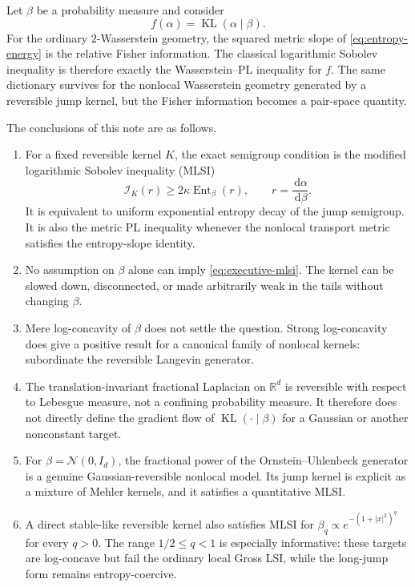\documentclass[11pt]{article}
\theoremstyle{definition}
\DeclareMathOperator{\Ent}{Ent}
\DeclareMathOperator{\KL}{KL}
\newcommand{\R}{\mathbb R}
\newcommand{\dd}{\,\mathrm d}
\newcommand{\cI}{\mathcal I}
\newcommand{\abs}[1]{\left\lvert #1\right\rvert}
\begin{document}
Let $\beta$ be a probability measure and consider
\begin{equation}\label{eq:entropy-energy}
  f(\alpha)=\KL(\alpha\mid\beta).
\end{equation}
For the ordinary $2$-Wasserstein geometry, the squared metric slope of
\eqref{eq:entropy-energy} is the relative Fisher information.  The classical
logarithmic Sobolev inequality is therefore exactly the Wasserstein--PL
inequality for $f$.  The same dictionary survives for the nonlocal
Wasserstein geometry generated by a reversible jump kernel, but the Fisher
information becomes a pair-space quantity.

The conclusions of this note are as follows.
\begin{enumerate}[label=\arabic*.,leftmargin=2.2em]
  \item For a fixed reversible kernel $K$, the exact semigroup condition is
  the modified logarithmic Sobolev inequality (MLSI)
  \begin{equation}\label{eq:executive-mlsi}
    \cI_K(r)\geq 2\kappa\Ent_\beta(r),
    \qquad r=\frac{\dd\alpha}{\dd\beta}.
  \end{equation}
  It is equivalent to uniform exponential entropy decay of the jump
  semigroup.  It is also the metric PL inequality whenever the nonlocal
  transport metric satisfies the entropy-slope identity.
  \item No assumption on $\beta$ alone can imply
  \eqref{eq:executive-mlsi}.  The kernel can be slowed down, disconnected, or
  made arbitrarily weak in the tails without changing $\beta$.
  \item Mere log-concavity of $\beta$ does not settle the question.  Strong
  log-concavity does give a positive result for a canonical family of
  nonlocal kernels: subordinate the reversible Langevin generator.
  \item The translation-invariant fractional Laplacian on $\R^d$ is
  reversible with respect to Lebesgue measure, not a confining probability
  measure.  It therefore does not directly define the gradient flow of
  $\KL(\cdot\mid\beta)$ for a Gaussian or another nonconstant target.
  \item For $\beta=\mathcal N(0,I_d)$, the fractional power of the
  Ornstein--Uhlenbeck generator is a genuine Gaussian-reversible nonlocal
  model.  Its jump kernel is explicit as a mixture of Mehler kernels, and it
  satisfies a quantitative MLSI.
  \item A direct stable-like reversible kernel also satisfies MLSI for
  $\beta_q\propto e^{-(1+\abs x^2)^q}$ for every $q>0$.  The range
  $1/2\leq q<1$ is especially informative: these targets are log-concave but
  fail the ordinary local Gross LSI, while the long-jump form remains
  entropy-coercive.
\end{enumerate}
\end{document}
